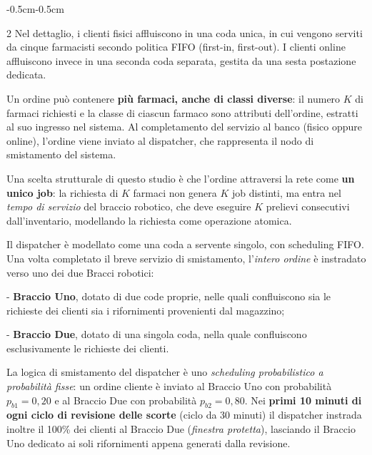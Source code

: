 \documentclass{article}
\begin{document}
\begin{adjustwidth}{-0.5cm}{-0.5cm}
\begin{multicols}{2}
Nel dettaglio, i clienti fisici affluiscono in una coda unica, in cui vengono serviti da cinque
farmacisti secondo politica FIFO (first-in, first-out). I clienti online affluiscono invece in una
seconda coda separata, gestita da una sesta postazione dedicata.

Un ordine può contenere \textbf{più farmaci, anche di classi diverse}: il numero $K$ di farmaci
richiesti e la classe di ciascun farmaco sono attributi dell'ordine, estratti al suo ingresso nel
sistema. Al completamento del servizio al banco (fisico oppure online), l'ordine viene inviato al
dispatcher, che rappresenta il nodo di smistamento del sistema.

Una scelta strutturale di questo studio è che l'ordine attraversi la rete come \textbf{un unico
job}: la richiesta di $K$ farmaci non genera $K$ job distinti, ma entra nel \emph{tempo di
servizio} del braccio robotico, che deve eseguire $K$ prelievi consecutivi dall'inventario, modellando la richiesta come operazione atomica. 

Il dispatcher è modellato come una coda a servente singolo, con scheduling FIFO. Una volta
completato il breve servizio di smistamento, l'\emph{intero ordine} è instradato verso uno dei due
Bracci robotici:

- \textbf{Braccio Uno}, dotato di due code proprie, nelle quali confluiscono sia le richieste dei
clienti sia i rifornimenti provenienti dal magazzino;

- \textbf{Braccio Due}, dotato di una singola coda, nella quale confluiscono esclusivamente le
richieste dei clienti.

La logica di smistamento del dispatcher è uno \emph{scheduling probabilistico a probabilità
fisse}: un ordine cliente è inviato al Braccio Uno con probabilità $p_{b1}=0{,}20$ e al Braccio
Due con probabilità $p_{b2}=0{,}80$. Nei \textbf{primi 10 minuti di ogni ciclo di revisione delle
scorte} (ciclo da 30 minuti) il dispatcher instrada inoltre il 100\% dei clienti al Braccio Due
(\emph{finestra protetta}), lasciando il Braccio Uno dedicato ai soli rifornimenti appena
generati dalla revisione.


\end{multicols}
\end{adjustwidth}
\end{document}
